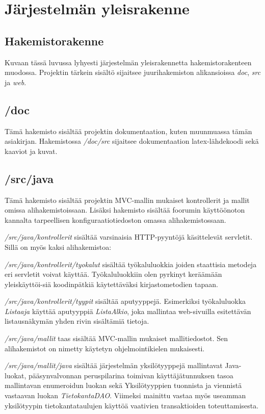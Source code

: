 \documentclass[11pt]{article}
\begin{document}
\newpage
\thispagestyle{plain}
	\section{Järjestelmän yleisrakenne}
		\subsection{Hakemistorakenne}
			Kuvaan tässä luvussa lyhyesti järjestelmän yleisrakennetta hakemistorakenteen muodossa.
			Projektin tärkein sisältö sijaitsee juurihakemiston alikansioissa \emph{doc}, \emph{src} ja
			\emph{web}.
	
		\subsection{/doc}
			Tämä hakemisto sisältää projektin dokumentaation, kuten muunmuassa tämän asiakirjan. Hakemistossa
			\emph{/doc/src} sijaitsee dokumentaation latex-lähdekoodi sekä kaaviot ja kuvat.
			
		\subsection{/src/java}
			Tämä hakemisto sisältää projektin MVC-mallin mukaiset kontrollerit ja mallit omissa
			alihakemistoissaan. Lisäksi hakemisto sisältää foorumin käyttöönoton kannalta tarpeellisen
			konfiguraatiotiedoston omassa alihakemistossaan.
			
			\emph{/src/java/kontrollerit} sisältää varsinaisia HTTP-pyyntöjä käsittelevät servletit. Sillä on
			myös kaksi alihakemistoa:
			
			\emph{/src/java/kontrollerit/tyokalut} sisältää työkaluluokkia joiden staattisia metodeja eri
			servletit voivat käyttää. Työkaluluokkiin olen pyrkinyt keräämään yleiskäyttöi-siä koodinpätkiä
			käytettäväksi kirjastometodien tapaan.
			
			\emph{/src/java/kontrollerit/tyypit} sisältää aputyyppejä. Esimerkiksi työkaluluokka
			\emph{Listaaja} käyttää aputyyppiä \emph{ListaAlkio}, joka mallintaa web-sivuilla esitettävän
			listausnäkymän yhden rivin sisältämiä tietoja.
			
			\emph{/src/java/mallit} taas sisältää MVC-mallin mukaiset mallitiedostot. Sen alihakemistot on
			nimetty käytetyn ohjelmointikielen mukaisesti.
			
			\emph{/src/java/mallit/java} sisältää järjestelmän yksilötyyppejä mallintavat Java-luokat,
			pääsynvalvonnan peruspilarina toimivan käyttäjätunnuksen tasoa mallintavan enumeroidun luokan
			sekä Yksilötyyppien tuonnista ja viennistä vastaavan luokan \emph{TietokantaDAO}. Viimeksi
			mainittu vastaa myös useamman yksilötyypin tietokantataulujen käyttöä vaativien transaktioiden
			toteuttamisesta.
			
\end{document}
